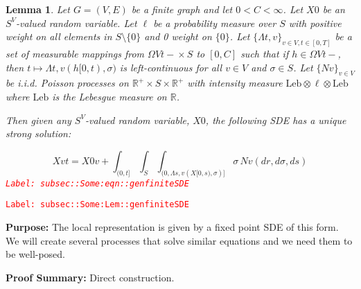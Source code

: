 \documentclass[12pt]{article}
\newcommand{\mb}{\mathbb}
\newcommand{\te}{\text}
\newcommand{\tr}{\textcolor{red}}
\newcommand{\labe}[1]{\tr{\texttt{Label: #1}}}
\newcommand{\purpose}{\textbf{Purpose: }}
\newcommand{\pfsum}{\textbf{Proof Summary: }}
\newcommand{\ind}{\hspace{24pt}}
\renewcommand{\v}{v}							%
\renewcommand{\S}{S}							%
\newcommand{\s}{\sigma}							%
\newcommand{\T}{T}								%
\renewcommand{\t}{t}							%
\renewcommand{\tt}{s}							%
\newcommand{\X}{X}								%
\newcommand{\const}{C}							%
\newcommand{\poiss}{N}							%
\newcommand{\leb}{\te{Leb}}						%
\newcommand{\Sm}{\ell}							%
\renewcommand{\r}{r}							%
\newcommand{\ratee}{\Lambda}					%
\newtheorem{lem}[thms]{Lemma}
\begin{document}
\begin{lem}
Let \(G = ( V,E)\) be a finite graph and let \(0 < \const{}< \infty\). Let \(\X{}{0}\) be an \(\S^ V\)-valued random variable. Let \(\Sm\) be a probability measure over \(\S\) with positive weight on all elements in \(S\setminus\{0\}\) and 0 weight on \(\{0\}\). Let \(\{\ratee{\t,\v}\}_{\v \in  V,\t\in [0,\T]}\) be a set of measurable mappings from \(\Omega{ V}{\t-} \times \S\) to \([0,\const{}]\) such that if \(h \in \Omega{ V}{\t-}\), then \(\t\mapsto \ratee{\t,\v}(h[0,\t),\s)\) is left-continuous for all \(\v \in  V\) and \(\s \in \S\). Let \(\{\poiss{\v}\}_{\v \in  V}\) be i.i.d. Poisson processes on \(\mb{R}^+\times \S\times\mb{R}^+\) with intensity measure \(\leb\otimes\Sm\otimes\leb\) where \(\leb\) is the Lebesgue measure on \(\mb{R}\).

\ind Then given any \(\S^ V\)-valued random variable, \(\X{}{0}\), the following SDE has a unique strong solution:

\begin{equation}
\X{\v}{\t} = \X{0}{\v} + \int_{(0,\t]}\int_\S\int_{(0,\ratee{\tt,\v}(\X{}{[0,\tt)},\s)]}  \s\,\poiss{\v}(d\r,d\s,d\tt)
\label{subsec::Some:eqn::genfiniteSDE}
\end{equation}
\labe{subsec::Some:eqn::genfiniteSDE}
\label{subsec::Some:Lem::genfiniteSDE}
\end{lem}
\labe{subsec::Some:Lem::genfiniteSDE}

\purpose The local representation is given by a fixed point SDE of this form. We will create several processes that solve similar equations and we need them to be well-posed.

\pfsum Direct construction.
\end{document}
